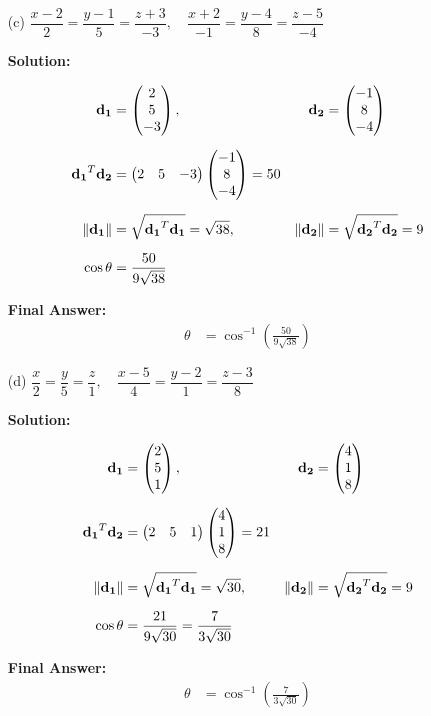 \documentclass[12pt]{article}
\begin{document}
\begin{enumerate}
\item[(c)] 
$\dfrac{x-2}{2} = \dfrac{y-1}{5} = \dfrac{z+3}{-3}, 
\quad 
\dfrac{x+2}{-1} = \dfrac{y-4}{8} = \dfrac{z-5}{-4}$

\textbf{Solution:}  

\begin{align}
\mathbf{d_1} &= \begin{pmatrix}2 \\ 5 \\ -3\end{pmatrix}, &
\mathbf{d_2} &= \begin{pmatrix}-1 \\ 8 \\ -4\end{pmatrix} \\[6pt]
\mathbf{d_1}^T \mathbf{d_2} &= \begin{pmatrix}2 & 5 & -3\end{pmatrix}\begin{pmatrix}-1 \\ 8 \\ -4\end{pmatrix} = 50 \\[6pt]
\|\mathbf{d_1}\| &= \sqrt{\mathbf{d_1}^T \mathbf{d_1}} = \sqrt{38}, &
\|\mathbf{d_2}\| &= \sqrt{\mathbf{d_2}^T \mathbf{d_2}} = 9 \\[6pt]
\cos\theta &= \frac{50}{9\sqrt{38}}
\end{align}

\textbf{Final Answer:}  
\begin{align}
\theta &= \cos^{-1}\!\left(\tfrac{50}{9\sqrt{38}}\right)
\end{align}

\item[(d)] 
$\dfrac{x}{2} = \dfrac{y}{5} = \dfrac{z}{1}, 
\quad 
\dfrac{x-5}{4} = \dfrac{y-2}{1} = \dfrac{z-3}{8}$

\textbf{Solution:}  

\begin{align}
\mathbf{d_1} &= \begin{pmatrix}2 \\ 5 \\ 1\end{pmatrix}, &
\mathbf{d_2} &= \begin{pmatrix}4 \\ 1 \\ 8\end{pmatrix} \\[6pt]
\mathbf{d_1}^T \mathbf{d_2} &= \begin{pmatrix}2 & 5 & 1\end{pmatrix}\begin{pmatrix}4 \\ 1 \\ 8\end{pmatrix} = 21 \\[6pt]
\|\mathbf{d_1}\| &= \sqrt{\mathbf{d_1}^T \mathbf{d_1}} = \sqrt{30}, &
\|\mathbf{d_2}\| &= \sqrt{\mathbf{d_2}^T \mathbf{d_2}} = 9 \\[6pt]
\cos\theta &= \frac{21}{9\sqrt{30}} = \frac{7}{3\sqrt{30}}
\end{align}

\textbf{Final Answer:}  
\begin{align}
\theta &= \cos^{-1}\!\left(\tfrac{7}{3\sqrt{30}}\right)
\end{align}

\end{enumerate}
\end{document}

